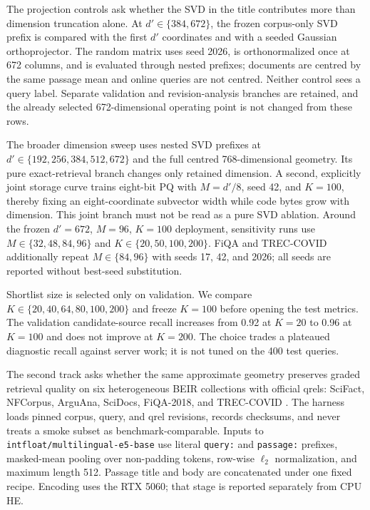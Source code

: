 \documentclass[pdflatex,sn-basic,Numbered]{sn-jnl}
\theoremstyle{plain}
\begin{document}
The projection controls ask whether the SVD in the title contributes more than dimension truncation alone. At $d'\in\{384,672\}$, the frozen corpus-only SVD prefix is compared with the first $d'$ coordinates and with a seeded Gaussian orthoprojector. The random matrix uses seed 2026, is orthonormalized once at 672 columns, and is evaluated through nested prefixes; documents are centred by the same passage mean and online queries are not centred. Neither control sees a query label. Separate validation and revision-analysis branches are retained, and the already selected 672-dimensional operating point is not changed from these rows.

The broader dimension sweep uses nested SVD prefixes at $d'\in\{192,256,384,512,672\}$ and the full centred 768-dimensional geometry. Its pure exact-retrieval branch changes only retained dimension. A second, explicitly joint storage curve trains eight-bit PQ with $M=d'/8$, seed 42, and $K=100$, thereby fixing an eight-coordinate subvector width while code bytes grow with dimension. This joint branch must not be read as a pure SVD ablation. Around the frozen $d'=672$, $M=96$, $K=100$ deployment, sensitivity runs use $M\in\{32,48,84,96\}$ and $K\in\{20,50,100,200\}$. FiQA and TREC-COVID additionally repeat $M\in\{84,96\}$ with seeds 17, 42, and 2026; all seeds are reported without best-seed substitution.

Shortlist size is selected only on validation. We compare $K\in\{20,40,64,80,100,200\}$ and freeze $K=100$ before opening the test metrics. The validation candidate-source recall increases from 0.92 at $K=20$ to 0.96 at $K=100$ and does not improve at $K=200$. The choice trades a plateaued diagnostic recall against server work; it is not tuned on the 400 test queries.

The second track asks whether the same approximate geometry preserves graded retrieval quality on six heterogeneous BEIR collections with official qrels: SciFact, NFCorpus, ArguAna, SciDocs, FiQA-2018, and TREC-COVID \cite{Thakur2021BEIR}. The harness loads pinned corpus, query, and qrel revisions, records checksums, and never treats a smoke subset as benchmark-comparable. Inputs to \texttt{intfloat/multilingual-e5-base} use literal \texttt{query:} and \texttt{passage:} prefixes, masked-mean pooling over non-padding tokens, row-wise $\ell_2$ normalization, and maximum length 512. Passage title and body are concatenated under one fixed recipe. Encoding uses the RTX 5060; that stage is reported separately from CPU HE.
\end{document}
